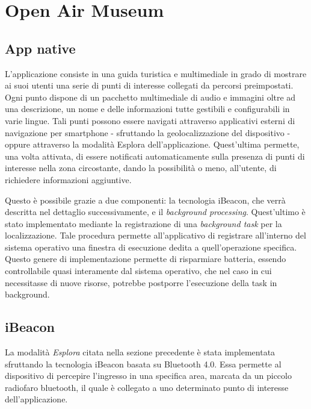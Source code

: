 \chapter{Open Air Museum} %
\label{Open Air Museum}

\vspace{5mm}

\section{App native}\vspace{5mm}

L’applicazione consiste in una guida turistica e multimediale in grado di mostrare ai suoi utenti una serie di punti di interesse collegati da percorsi preimpostati. Ogni punto dispone di un pacchetto multimediale di audio e immagini oltre ad una descrizione, un nome e delle informazioni tutte gestibili e configurabili in varie lingue. Tali punti possono essere navigati attraverso applicativi esterni di navigazione per smartphone - sfruttando la geolocalizzazione del dispositivo - oppure attraverso la modalità Esplora dell’applicazione. Quest'ultima permette, una volta attivata, di essere notificati automaticamente sulla presenza di punti di interesse nella zona circostante, dando la possibilità o meno, all’utente, di richiedere informazioni aggiuntive. \vspace{5mm}

Questo è possibile grazie a due componenti: la tecnologia iBeacon, che verrà descritta nel dettaglio successivamente, e il \emph{background processing}. Quest'ultimo è stato implementato mediante la registrazione di una \emph{background task} per la localizzazione. Tale procedura permette all'applicativo di registrare all'interno del sistema operativo una finestra di esecuzione dedita a quell'operazione specifica. Questo genere di implementazione permette di risparmiare batteria, essendo controllabile quasi interamente dal sistema operativo, che nel caso in cui necessitasse di nuove risorse, potrebbe postporre l'esecuzione della task in background.

\section{iBeacon}\vspace{5mm}

La modalità \emph{Esplora} citata nella sezione precedente è stata implementata sfruttando la tecnologia iBeacon basata su Bluetooth 4.0. Essa permette al dispositivo di percepire l’ingresso in una specifica area, marcata da un piccolo radiofaro bluetooth, il quale è collegato a uno determinato punto di interesse dell'applicazione.\vspace{5mm}

